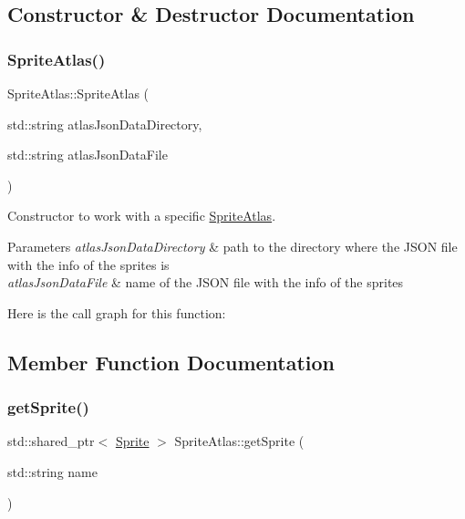 \subsection{Constructor \& Destructor Documentation}
\hypertarget{class_mason_1_1_sprite_atlas_a7740eb98380f42a0d5b787d44114be8f}{}\label{class_mason_1_1_sprite_atlas_a7740eb98380f42a0d5b787d44114be8f} 
\subsubsection{\texorpdfstring{Sprite\+Atlas()}{SpriteAtlas()}}
{\footnotesize\ttfamily Sprite\+Atlas\+::\+Sprite\+Atlas (\begin{DoxyParamCaption}\item[{std\+::string}]{atlas\+Json\+Data\+Directory,  }\item[{std\+::string}]{atlas\+Json\+Data\+File }\end{DoxyParamCaption})}



Constructor to work with a specific \hyperlink{class_mason_1_1_sprite_atlas}{Sprite\+Atlas}. 


\begin{DoxyParams}{Parameters}
{\em atlas\+Json\+Data\+Directory} & path to the directory where the J\+S\+ON file with the info of the sprites is \\
\hline
{\em atlas\+Json\+Data\+File} & name of the J\+S\+ON file with the info of the sprites \\
\hline
\end{DoxyParams}
Here is the call graph for this function\+:


\subsection{Member Function Documentation}
\hypertarget{class_mason_1_1_sprite_atlas_a05b230664b024ef23726bfa509da6a40}{}\label{class_mason_1_1_sprite_atlas_a05b230664b024ef23726bfa509da6a40} 
\subsubsection{\texorpdfstring{get\+Sprite()}{getSprite()}}
{\footnotesize\ttfamily std\+::shared\+\_\+ptr$<$ \hyperlink{class_mason_1_1_sprite}{Sprite} $>$ Sprite\+Atlas\+::get\+Sprite (\begin{DoxyParamCaption}\item[{std\+::string}]{name }\end{DoxyParamCaption})}



